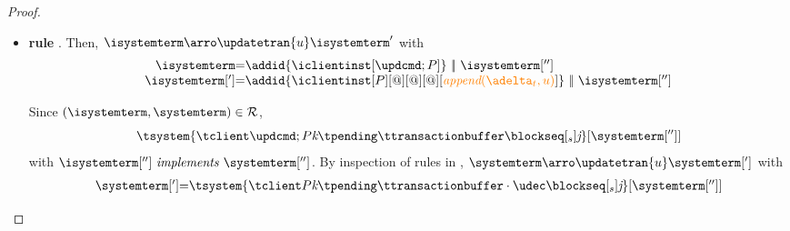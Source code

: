 \begin{proof}
\begin{itemize}
		
			
			\begin{itemize}
\item {\bf rule }. Then, $\isystemterm  \arroi{\updatetran{u}} \isystemterm '$ with 
				\[\begin{array}{r@{=}l}
					\isystemterm & \addid{\iclientinst[\tupdateins]} \ \bigpar \ \isystemterm['']
					\\
					\isystemterm['] & \addid{\iclientinst[P][@][@][@][\iappend{\transactionbuffer}{u}]} \ \bigpar \   \isystemterm['']	
				  \end{array}
				\]
				
				Since $(\isystemterm,\systemterm)\in \mathcal{R}$,
				\[ \tsystem{\tclienti{\tupdateins}{\tknown}{\tpending}{\ttransactionbuffer}{\tsent}{\treceivebuffer}}[{\systemterm['']}] \]
				with $\implements{\isystemterm['']}{\systemterm['']}$. By inspection of rules in \figref{}, 
				$\systemterm \arroi{\updatetran{u}} \systemterm[']$ with
				\[\begin{array}{r@{=}l}
						\systemterm['] & \tsystem{\tclienti{\tprogram}{\tknown}{\tpending}{\ttransactionbuffer \cdot \tupdate}{\tsent}{\treceivebuffer}}[{\systemterm['']}]	
				  \end{array}		
				\]
				

\end{itemize}
\end{itemize}
\end{proof}
